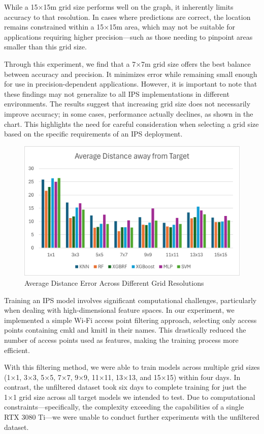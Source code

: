 \documentclass[conference]{IEEEtran}
\begin{document}
	While a 15×15m grid size performs well on the graph, it inherently limits accuracy to that resolution. In cases where predictions are correct, the location remains constrained within a 15×15m area, which may not be suitable for applications requiring higher precision—such as those needing to pinpoint areas smaller than this grid size.
	
	Through this experiment, we find that a 7×7m grid size offers the best balance between accuracy and precision. It minimizes error while remaining small enough for use in precision-dependent applications. However, it is important to note that these findings may not generalize to all IPS implementations in different environments. The results suggest that increasing grid size does not necessarily improve accuracy; in some cases, performance actually declines, as shown in the chart. This highlights the need for careful consideration when selecting a grid size based on the specific requirements of an IPS deployment.
	
	\begin{figure}[htbp]
		\centerline{\includegraphics[scale=0.65]{image2.png}}
		\caption{Average Distance Error Across Different Grid Resolutions}
		\label{fig5}
	\end{figure}
	
	Training an IPS model involves significant computational challenges, particularly when dealing with high-dimensional feature spaces. In our experiment, we implemented a simple Wi-Fi access point filtering approach, selecting only access points containing cmkl and kmitl in their names. This drastically reduced the number of access points used as features, making the training process more efficient.
	
	With this filtering method, we were able to train models across multiple grid sizes (1×1, 3×3, 5×5, 7×7, 9×9, 11×11, 13×13, and 15×15) within four days. In contrast, the unfiltered dataset took six days to complete training for just the 1×1 grid size across all target models we intended to test. Due to computational constraints—specifically, the complexity exceeding the capabilities of a single RTX 3080 Ti—we were unable to conduct further experiments with the unfiltered dataset.
	
\end{document}
